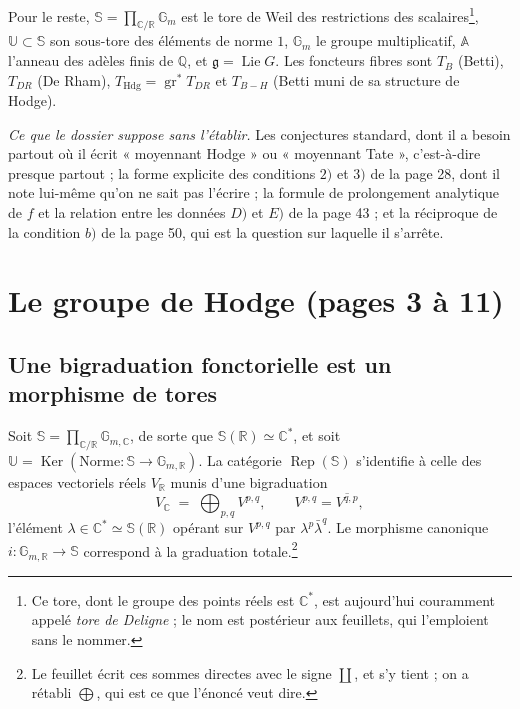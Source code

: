 \documentclass[11pt,a4paper]{article}
\begin{document}
Pour le reste, $\mathbb{S} = \prod_{\mathbb{C}/\mathbb{R}} \mathbb{G}_{m}$ est
le tore de Weil des restrictions des scalaires\footnote{Ce tore, dont le groupe
des points réels est $\mathbb{C}^{*}$, est aujourd'hui couramment appelé
\emph{tore de Deligne} ; le nom est postérieur aux feuillets, qui l'emploient
sans le nommer.}, $\mathbb{U} \subset \mathbb{S}$ son sous-tore des éléments de
norme $1$, $\mathbb{G}_{m}$ le groupe multiplicatif, $\mathbb{A}$ l'anneau des
adèles finis de $\mathbb{Q}$, et $\mathfrak{g} = \operatorname{Lie} G$. Les
foncteurs fibres sont $T_{B}$ (Betti), $T_{DR}$ (De Rham),
$T_{\mathrm{Hdg}} = \operatorname{gr}^{*} T_{DR}$ et $T_{B-H}$ (Betti muni de sa
structure de Hodge).

\emph{Ce que le dossier suppose sans l'établir.} Les conjectures standard, dont
il a besoin partout où il écrit « moyennant Hodge » ou « moyennant Tate »,
c'est-à-dire presque partout ; la forme explicite des conditions $2)$ et $3)$ de
la page 28, dont il note lui-même qu'on ne sait pas l'écrire ; la formule de
prolongement analytique de $f$ et la relation entre les données $D)$ et $E)$ de
la page 43 ; et la réciproque de la condition $b)$ de la page 50, qui est la
question sur laquelle il s'arrête.

\section*{Le groupe de Hodge (pages 3 à 11)}

\subsection*{Une bigraduation fonctorielle est un morphisme de tores}

Soit $\mathbb{S} = \prod_{\mathbb{C}/\mathbb{R}} \mathbb{G}_{m,\mathbb{C}}$,
de sorte que $\mathbb{S}(\mathbb{R}) \simeq \mathbb{C}^{*}$, et soit
$\mathbb{U} = \operatorname{Ker}(\text{Norme} : \mathbb{S} \to
\mathbb{G}_{m,\mathbb{R}})$. La catégorie $\operatorname{Rep}(\mathbb{S})$
s'identifie à celle des espaces vectoriels réels $V_{\mathbb{R}}$ munis d'une
bigraduation
\[
V_{\mathbb{C}} \;=\; \bigoplus_{p,q} V^{p,q} , \qquad V^{p,q} = \overline{V^{q,p}} ,
\]
l'élément $\lambda \in \mathbb{C}^{*} \simeq \mathbb{S}(\mathbb{R})$ opérant sur
$V^{p,q}$ par $\lambda^{p} \bar{\lambda}^{q}$. Le morphisme canonique
$i : \mathbb{G}_{m,\mathbb{R}} \to \mathbb{S}$ correspond à la graduation
totale.\footnote{Le feuillet écrit ces sommes directes avec le signe $\coprod$,
et s'y tient ; on a rétabli $\bigoplus$, qui est ce que l'énoncé veut dire.}
\end{document}
